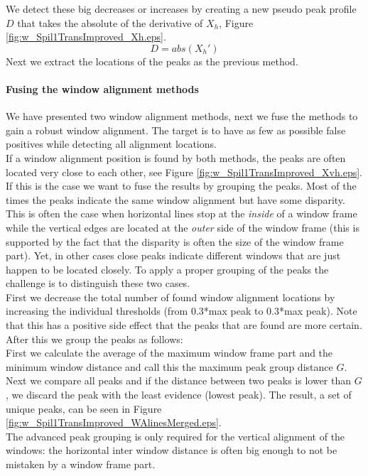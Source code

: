 We detect these big decreases or increases by creating a new pseudo peak profile
$D$ that takes the absolute of the derivative of $X_h$, Figure \ref{fig:w_Spil1TransImproved_Xh.eps}.
\[D = abs( X_{h}')\]
Next we extract the locations of the peaks as the previous method.

\paragraph{Fusing the window alignment methods}
We have presented two window alignment methods, next we fuse the methods to
gain a robust window alignment.
The target is to have as few as possible false positives while detecting all alignment locations.\\

If a window alignment position is found by both methods, the peaks are often
located very close to each other, see Figure
\ref{fig:w_Spil1TransImproved_Xvh.eps}.  If this is the case we want to fuse the results by grouping the peaks.
Most of the times the peaks indicate the same window alignment but have
some disparity.  This is often the case when horizontal lines stop at the \emph{inside}
of a window frame while the vertical edges are located at the \emph{outer} side of the
window frame (this is supported by the fact that the disparity is often the size of the window frame part).  
Yet, in other cases close peaks indicate different windows that are just happen to be
located closely.  To apply a proper grouping of the peaks the challenge is to
distinguish these two cases.\\

First we decrease the total number of found window alignment locations by increasing the individual thresholds (from 0.3*max
peak to 0.3*max peak). Note that this has a positive side effect that the peaks that are found are more certain.
After this we group the peaks as follows: \\
First we calculate the average of the maximum window frame part and the minimum window
distance and call this the maximum peak group distance $G$.
Next we compare all peaks and if the distance between two peaks is lower than
$G$, we discard the peak with the least evidence (lowest peak). The result,
a set of unique peaks, can be seen in Figure \ref{fig:w_Spil1TransImproved_WAlinesMerged.eps}.\\

The advanced peak grouping is only required for the vertical alignment
of the windows: the horizontal inter window distance is often big enough to not
be mistaken by a window frame part.

